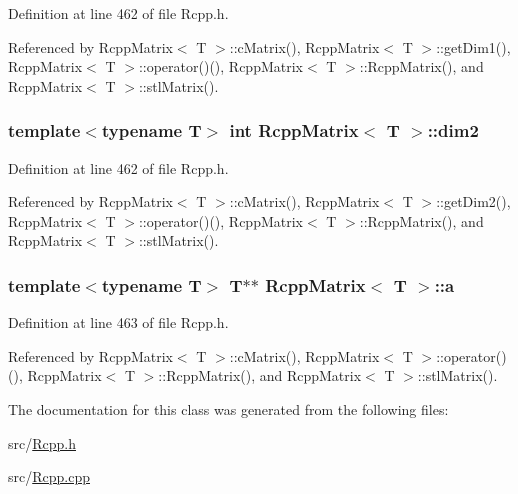 Definition at line 462 of file Rcpp.h.

Referenced by RcppMatrix$<$ T $>$::cMatrix(), RcppMatrix$<$ T $>$::getDim1(), RcppMatrix$<$ T $>$::operator()(), RcppMatrix$<$ T $>$::RcppMatrix(), and RcppMatrix$<$ T $>$::stlMatrix().\hypertarget{classRcppMatrix_d01bc64d89dcc475f7c90f1580bf5d52}{
\subsubsection[dim2]{\setlength{\rightskip}{0pt plus 5cm}template$<$typename T$>$ int {\bf RcppMatrix}$<$ T $>$::{\bf dim2}}}
\label{classRcppMatrix_d01bc64d89dcc475f7c90f1580bf5d52}




Definition at line 462 of file Rcpp.h.

Referenced by RcppMatrix$<$ T $>$::cMatrix(), RcppMatrix$<$ T $>$::getDim2(), RcppMatrix$<$ T $>$::operator()(), RcppMatrix$<$ T $>$::RcppMatrix(), and RcppMatrix$<$ T $>$::stlMatrix().\hypertarget{classRcppMatrix_3f4dad8e2aed525c9b20e98d262ec31e}{
\subsubsection[a]{\setlength{\rightskip}{0pt plus 5cm}template$<$typename T$>$ T$\ast$$\ast$ {\bf RcppMatrix}$<$ T $>$::{\bf a}}}
\label{classRcppMatrix_3f4dad8e2aed525c9b20e98d262ec31e}




Definition at line 463 of file Rcpp.h.

Referenced by RcppMatrix$<$ T $>$::cMatrix(), RcppMatrix$<$ T $>$::operator()(), RcppMatrix$<$ T $>$::RcppMatrix(), and RcppMatrix$<$ T $>$::stlMatrix().

The documentation for this class was generated from the following files:\begin{CompactItemize}
\item 
src/\hyperlink{Rcpp_8h}{Rcpp.h}\item 
src/\hyperlink{Rcpp_8cpp}{Rcpp.cpp}\end{CompactItemize}

